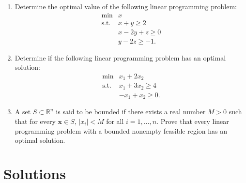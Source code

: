 \documentclass[]{book}
\def\lt{<}
\def\gt{>}
\newcommand{\RR}{\mathbb{R}}
\renewcommand{\vec}[1]{\mathbf{#1}}
\theoremstyle{definition}
\theoremstyle{definition}
\theoremstyle{remark}
\begin{document}
\begin{enumerate}
\def\labelenumi{\arabic{enumi}.}
\item
  Determine the optimal value of the following linear programming
  problem: \[
  \begin{array}{rl}
  \min & x \\
  \text{s.t.}
  & x + y  \geq 2 \\
  & x - 2y + z \geq 0 \\
  &   y - 2z \geq -1.
  \end{array}
  \]
\item
  Determine if the following linear programming problem has an optimal
  solution: \[
  \begin{array}{rl}
  \min & x_1 + 2x_2 \\
  \text{s.t.}
  & x_1 + 3x_2  \geq 4 \\
  & -x_1 + x_2  \geq 0.
  \end{array}
  \]
\item
  A set \(S \subset \RR^n\) is said to be bounded if there exists a real
  number \(M \gt 0\) such that for every \(\vec{x} \in S\),
  \(|x_i| \lt M\) for all \(i = 1,\ldots, n\). Prove that every linear
  programming problem with a bounded nonempty feasible region has an
  optimal solution.
\end{enumerate}

\section*{Solutions}\label{solutions-5}
\end{document}
